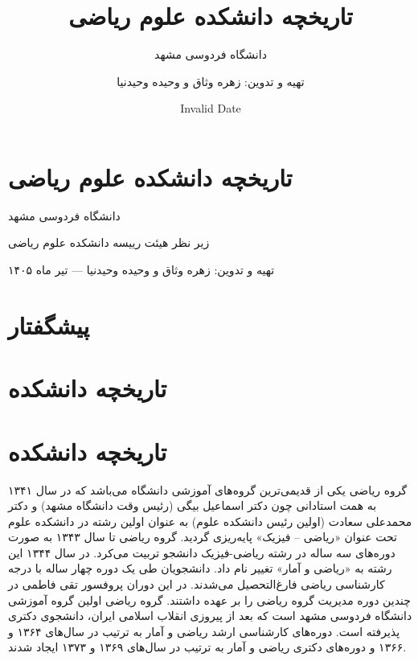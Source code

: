\documentclass[
  letterpaper,
  DIV=11,
  numbers=noendperiod]{scrreprt}
\title{تاریخچه دانشکده علوم ریاضی}
\subtitle{دانشگاه فردوسی مشهد}
\author{تهیه و تدوین: زهره وثاق و وحیده وحیدنیا}
\date{Invalid Date}
\renewcommand*\contentsname{Table of contents}
\newcommand\contentsname{Table of contents}
\begin{document}
\maketitle

\renewcommand*\contentsname{Table of contents}
{
\setcounter{tocdepth}{2}
\tableofcontents
}


\chapter{تاریخچه دانشکده علوم
ریاضی}\label{ux62aux627ux631ux6ccux62eux686ux647-ux62fux627ux646ux634ux6a9ux62fux647-ux639ux644ux648ux645-ux631ux6ccux627ux636ux6cc}

دانشگاه فردوسی مشهد

\hfill\break

زیر نظر هیئت رییسه دانشکده علوم ریاضی

تهیه و تدوین: زهره وثاق و وحیده وحیدنیا --- تیر ماه ۱۴۰۵


\chapter{پیشگفتار}\label{ux67eux6ccux634ux6afux641ux62aux627ux631}


\chapter{تاریخچه
دانشکده}\label{ux62aux627ux631ux6ccux62eux686ux647-ux62fux627ux646ux634ux6a9ux62fux647}


\chapter{تاریخچه
دانشکده}\label{ux62aux627ux631ux6ccux62eux686ux647-ux62fux627ux646ux634ux6a9ux62fux647-1}

گروه ریاضی یکی از قدیمی‌ترین گروه‌های آموزشی دانشگاه می‌باشد که در سال ۱۳۴۱
به همت استادانی چون دکتر اسماعیل بیگی (رئیس وقت دانشگاه مشهد) و دکتر
محمدعلی سعادت (اولین رئیس دانشکده علوم) به عنوان اولین رشته در دانشکده
علوم تحت عنوان «ریاضی -- فیزیک» پایه‌ریزی گردید. گروه ریاضی تا سال ۱۳۴۳
به صورت دوره‌های سه ساله در رشته ریاضی-فیزیک دانشجو تربیت می‌کرد. در سال
۱۳۴۴ این رشته به «ریاضی و آمار» تغییر نام داد. دانشجویان طی یک دوره چهار
ساله با درجه کارشناسی ریاضی فارغ‌التحصیل می‌شدند. در این دوران پروفسور تقی
فاطمی در چندین دوره مدیریت گروه ریاضی را بر عهده داشتند. گروه ریاضی
اولین گروه آموزشی دانشگاه فردوسی مشهد است که بعد از پیروزی انقلاب اسلامی
ایران، دانشجوی دکتری پذیرفته است. دوره‌های کارشناسی ارشد ریاضی و آمار به
ترتیب در سال‌های ۱۳۶۴ و ۱۳۶۶ و دوره‌های دکتری ریاضی و آمار به ترتیب در
سال‌های ۱۳۶۹ و ۱۳۷۳ ایجاد شدند.
\end{document}
